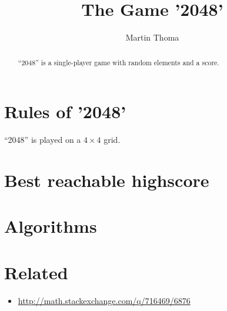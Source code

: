 \documentclass[a4paper]{scrartcl}
\title{The Game '2048'}
\author{Martin Thoma}
\begin{document}
\maketitle
\begin{abstract}
\enquote{2048} is a single-player game with random elements and a score.
\end{abstract}

\section{Rules of '2048'}
\enquote{2048} is played on a $4 \times 4$ grid.

\section{Best reachable highscore}

\section{Algorithms}

\section{Related}
\begin{itemize}
    \item \url{http://math.stackexchange.com/q/716469/6876}
\end{itemize}
\end{document}
